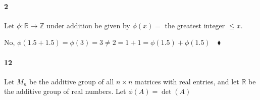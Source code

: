 \documentclass{article}
\newcommand\Z{\mathbb{Z}}
\newcommand\R{\mathbb{R}}
\begin{document}
\paragraph{2} Let $\phi:\R\rightarrow \Z$ under addition be given by
$\phi(x) =$ the greatest integer $\leq x.$

 No,  $\phi(1.5 + 1.5) = \phi(3) = 3 \neq 2 = 1 + 1 =
\phi(1.5) + \phi(1.5) \quad \blacklozenge$


\paragraph{12} Let $M_n$ be the additive group of all $n\times n$
matrices with real entries, and let $\R$ be the additive group of real
numbers. Let $\phi(A) = \det(A)$
\end{document}

